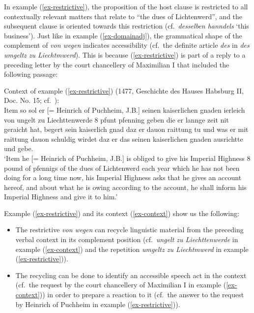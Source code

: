 \documentclass[output=paper
  ,nobabel
  ,draftmode
  ,babelshorthands
  ,colorlinks, citecolor=brown
]{langscibook}
\begin{document}
\largerpage[2]%
\noindent
In example (\ref{ex-restrictive}), the proposition of the host clause is restricted to all contextually relevant matters that relate to ``the dues of Lichtenwerd'', and the subsequent clause is oriented towards this restriction (cf.\ \emph{desselben hanndels }‘this business’). Just like in example (\ref{ex-domainadj}), the grammatical shape of the complement of \emph{von wegen} indicates accessibility (cf.\ the definite article \emph{des} in \emph{des umgeltz zu Liechtmwerd}). This is because (\ref{ex-restrictive}) is part of a reply to a preceding letter by the court chancellery of Maximilian I that included the following passage:

\eanoraggedright\label{ex-context} Context of example (\ref{ex-restrictive}) (1477, Geschichte des Hauses Habsburg II, Doc. No. 15; cf.\ \citealp[302]{Chmel1855}):\\[2pt]
Item so sol er [= Heinrich of Puchheim, J.B.] seinen kaiserlichen gnaden ierleich von ungelt zu Liechttenwerde 8 pfunt pfenning geben die er \mbox{lannge} zeit nit geraicht hat, begert sein kaiserlich gnad daz er dauon \mbox{raittung} tu und was er mit raittung dauon schuldig wirdet daz er das seinen \mbox{kaiserlichen} gnaden ausrichtte und gebe.\\
`Item he [= Heinrich of Puchheim, J.B.] is obliged to give his Imperial Highness 8 pound of pfennigs of the dues of Lichtenwerd each year which he has not been doing for a long time now, his Imperial Highness asks that he gives an account hereof, and about what he is owing according to the account, he shall inform his Imperial Highness and give it to him.'
\z

\noindent
Example (\ref{ex-restrictive}) and its context (\ref{ex-context}) show us the following:
%
\begin{itemize}
\item The restrictive \emph{von wegen} can recycle linguistic material from the preceding verbal context in its complement position (cf.\ \emph{ungelt zu Liechttenwerde} in example (\ref{ex-context}) and the repetition \emph{umgeltz zu Liechtmwerd} in example (\ref{ex-restrictive})).

\item The recycling can be done to identify an accessible speech act in the context (cf.\ the request by the court chancellery of Maximilian I in example (\ref{ex-context})) in order to prepare a reaction to it (cf.\ the answer to the request by Heinrich of Puchheim in example (\ref{ex-restrictive})).
\end{itemize}
\end{document}
